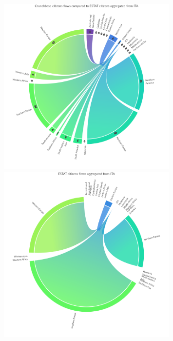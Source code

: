 \begin{figure}[t]
    \centering
    \includegraphics[width=0.8\textwidth]{images/ChordFlows/filtered_nationality/ita/Crunchbase_cit_ESTAT_True.png}
    \includegraphics[width=0.8\textwidth]{images/ChordFlows/filtered_nationality/ita/ESTAT_cit_True.png}
    \label{fig:chordita_nat_true}
\end{figure}
